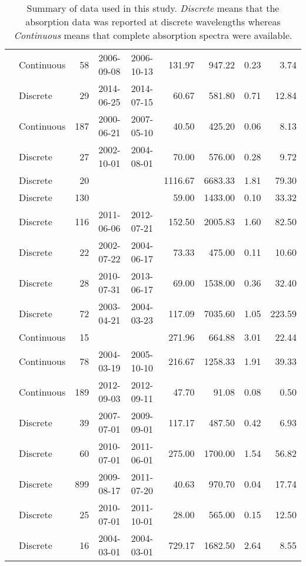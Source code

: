 \begin{table}[ht]
\begin{tabular}{llrllrrrr}
  \citet{Norman2011} & Continuous &  58 & 2006-09-08 & 2006-10-13 & 131.97 & 947.22 & 0.23 & 3.74 \\ 
  \citet{Oestreich2016} & Discrete &  29 & 2014-06-25 & 2014-07-15 & 60.67 & 581.80 & 0.71 & 12.84 \\ 
  \citet{Osburn2007} & Continuous & 187 & 2000-06-21 & 2007-05-10 & 40.50 & 425.20 & 0.06 & 8.13 \\ 
  \citet{Osburn2009} & Discrete &  27 & 2002-10-01 & 2004-08-01 & 70.00 & 576.00 & 0.28 & 9.72 \\ 
  \citet{Osburn2011a} & Discrete &  20 &  &  & 1116.67 & 6683.33 & 1.81 & 79.30 \\ 
  \citet{Osburn2016} & Discrete & 130 &  &  & 59.00 & 1433.00 & 0.10 & 33.32 \\ 
  \citet{Polaris2012} & Discrete & 116 & 2011-06-06 & 2012-07-21 & 152.50 & 2005.83 & 1.60 & 82.50 \\ 
  \citet{Retamal2007} & Discrete &  22 & 2002-07-22 & 2004-06-17 & 73.33 & 475.00 & 0.11 & 10.60 \\ 
  \citet{Shen2014} & Discrete &  28 & 2010-07-31 & 2013-06-17 & 69.00 & 1538.00 & 0.36 & 32.40 \\ 
  \citet{Sickman2010} & Discrete &  72 & 2003-04-21 & 2004-03-23 & 117.09 & 7035.60 & 1.05 & 223.59 \\ 
  \citet{Stedmon2007a} & Continuous &  15 &  &  & 271.96 & 664.88 & 3.01 & 22.44 \\ 
  \citet{Stedmon2011} & Continuous &  78 & 2004-03-19 & 2005-10-10 & 216.67 & 1258.33 & 1.91 & 39.33 \\ 
  \citet{Stedmon2015} & Continuous & 189 & 2012-09-03 & 2012-09-11 & 47.70 & 91.08 & 0.08 & 0.50 \\ 
  \citet{Tehrani2013} & Discrete &  39 & 2007-07-01 & 2009-09-01 & 117.17 & 487.50 & 0.42 & 6.93 \\ 
  \citet{Wagner2015} & Discrete &  60 & 2010-07-01 & 2011-06-01 & 275.00 & 1700.00 & 1.54 & 56.82 \\ 
  \citet{Werdell2003} & Discrete & 899 & 2009-08-17 & 2011-07-20 & 40.63 & 970.70 & 0.04 & 17.74 \\ 
  \citet{Yang2013a} & Discrete &  25 & 2010-07-01 & 2011-10-01 & 28.00 & 565.00 & 0.15 & 12.50 \\ 
  \citet{Zhang2005} & Discrete &  16 & 2004-03-01 & 2004-03-01 & 729.17 & 1682.50 & 2.64 & 8.55 \\ 
   \hline
\end{tabular}
\endgroup
\caption{Summary of data used in this study. \textit{Discrete} means that the 
absorption data was reported at discrete wavelengths whereas 
\textit{Continuous} means that complete absorption spectra were available.} 
\end{table}
